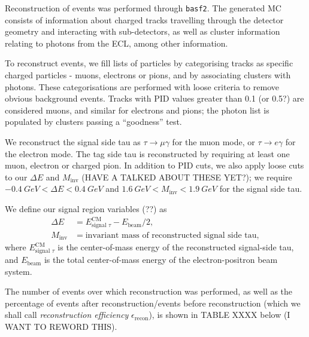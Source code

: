 \documentclass[12pt,a4paper]{article} %
\begin{document}
Reconstruction of events was performed through \texttt{basf2}. The generated MC consists of information about charged tracks travelling through the detector geometry and interacting with sub-detectors, as well as cluster information relating 
to photons from the ECL, among other information. 

To reconstruct events, we fill lists of particles by categorising tracks as specific charged particles - muons, electrons or pions, and by associating clusters with photons. These categorisations are performed with loose criteria to remove obvious background events. Tracks with PID values greater than 0.1 (or 0.5?) are considered muons, and similar for electrons and pions; the photon list is populated by clusters passing a ``goodness'' test. 





We reconstruct the signal side tau as $\tau \to \mu \gamma$ for the muon mode, or $\tau \to e \gamma$ for the electron mode. The tag side tau is reconstructed by requiring at least one muon, electron or charged pion. In addition to PID cuts, we also apply loose cuts to our $\Delta E$ and $M_{\text{inv}}$ (HAVE A TALKED ABOUT THESE YET?); we require $\SI{-0.4}{GeV} < \Delta E < \SI{0.4}{GeV}$ and $\SI{1.6}{GeV} < M_{\text{inv}} < \SI{1.9}{GeV}$ for the signal side tau.

We define our signal region variables (??) as
\begin{align}
\Delta E &= E^{\text{CM}}_{\text{signal }\tau} - E_{\text{beam}}/2,\\
M_{\text{inv}} &= \text{invariant mass of reconstructed signal side tau},
\end{align}
where $E^{\text{CM}}_{\text{signal }\tau}$ is the center-of-mass energy of the reconstructed signal-side tau, and $E_{\text{beam}}$ is the total center-of-mass energy of the electron-positron beam system.



The number of events over which reconstruction was performed, as well as the percentage of events after reconstruction/events before reconstruction (which we shall call \emph{reconstruction efficiency} $\epsilon_{\text{recon}}$), is shown in TABLE XXXX below (I WANT TO REWORD THIS).
\end{document}
